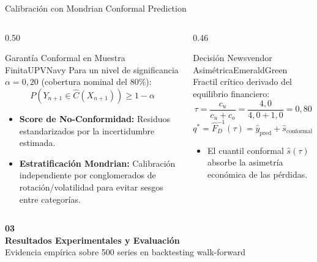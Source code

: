 \documentclass[aspectratio=169, 10pt]{beamer}
\begin{document}
\begin{frame}{Calibración con Mondrian Conformal Prediction}
  \begin{columns}[T]
    \begin{column}{0.50\textwidth}
      \begin{statbox}{Garantía Conformal en Muestra Finita}{UPVNavy}
        Para un nivel de significancia $\alpha = 0{,}20$ (cobertura nominal del $80\%$):
        $$P(Y_{n+1} \in \hat{C}(X_{n+1})) \ge 1 - \alpha$$
        \begin{itemize}\footnotesize
          \item \textbf{Score de No-Conformidad:} Residuos estandarizados por la incertidumbre estimada.
          \item \textbf{Estratificación Mondrian:} Calibración independiente por conglomerados de rotación/volatilidad para evitar sesgos entre categorías.
        \end{itemize}
      \end{statbox}
    \end{column}
    \begin{column}{0.46\textwidth}
      \begin{statbox}{Decisión Newsvendor Asimétrica}{EmeraldGreen}
        Fractil crítico derivado del equilibrio financiero:
        $$\tau = \frac{c_u}{c_u + c_o} = \frac{4{,}0}{4{,}0 + 1{,}0} = 0{,}80$$
        $$q^* = \hat{F}_D^{-1}(\tau) = \hat{y}_{\text{pred}} + \hat{s}_{\text{conformal}}(\tau)$$
        \begin{itemize}\footnotesize
          \item El cuantil conformal $\hat{s}(\tau)$ absorbe la asimetría económica de las pérdidas.
        \end{itemize}
      \end{statbox}
    \end{column}
  \end{columns}
\end{frame}

\begin{frame}[standout]
  \Huge \textbf{03} \\[0.4cm]
  \Large \textbf{Resultados Experimentales y Evaluación} \\[0.2cm]
  \normalsize Evidencia empírica sobre 500 series en backtesting walk-forward
\end{frame}
\end{document}
